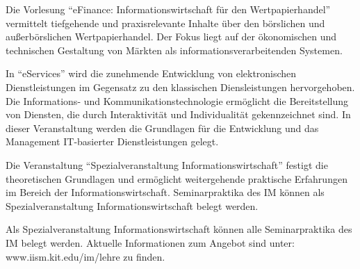 \begin{module}
\begin{content}
 

Die Vorlesung “eFinance: Informationswirtschaft für den Wertpapierhandel” vermittelt tiefgehende und praxisrelevante Inhalte über den börslichen und außerbörslichen Wertpapierhandel. Der Fokus liegt auf der ökonomischen und technischen Gestaltung von Märkten als informationsverarbeitenden Systemen.

 

In “eServices” wird die zunehmende Entwicklung von elektronischen Dienstleistungen im Gegensatz zu den klassischen Diensleistungen hervorgehoben. Die Informations- und Kommunikationstechnologie ermöglicht die Bereitstellung von Diensten, die durch Interaktivität und Individualität gekennzeichnet sind. In dieser Veranstaltung werden die Grundlagen für die Entwicklung und das Management IT-basierter Dienstleistungen gelegt.

 

Die Veranstaltung “Spezialveranstaltung Informationswirtschaft” festigt die theoretischen Grundlagen und ermöglicht weitergehende praktische Erfahrungen im Bereich der Informationswirtschaft. Seminarpraktika des IM können als Spezialveranstaltung Informationswirtschaft belegt werden.


\end{content}

\begin{remarks}Als Spezialveranstaltung Informationswirtschaft können alle Seminarpraktika des IM belegt werden. Aktuelle Informationen zum Angebot sind unter: www.iism.kit.edu/im/lehre zu finden.

\end{remarks}

\end{module}

